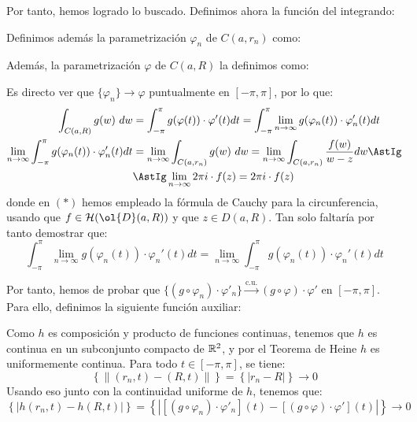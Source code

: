 \begin{ejercicio}
    Por tanto, hemos logrado lo buscado. Definimos ahora la función del integrando:

    Definimos además la parametrización $\varphi_n$ de $C(a,r_n)$ como:

    Además, la parametrización $\varphi$ de $C(a,R)$ la definimos como:

    Es directo ver que $\{\varphi_n\}\to \varphi$ puntualmente en $[-\pi,\pi]$, por lo que:
    \begin{align*}
        \int_{C(a,R)} g(w) \ dw &= \int_{-\pi}^\pi g(\varphi(t))\cdot \varphi'(t) dt
        = \int_{-\pi}^\pi \lim_{n\to\infty} g(\varphi_n(t))\cdot \varphi_n'(t) dt\\
        \lim_{n\to\infty} \int_{-\pi}^\pi g(\varphi_n(t))\cdot \varphi_n'(t) dt &= \lim_{n\to\infty} \int_{C(a,r_n)} g(w) \ dw
        = \lim_{n\to\infty} \int_{C(a,r_n)} \frac{f(w)}{w-z} dw \AstIg\\&\AstIg
        \lim_{n\to\infty} 2\pi i \cdot f(z) = 2\pi i \cdot f(z)
    \end{align*}
    donde en $(\ast)$ hemos empleado la fórmula de Cauchy para la circunferencia, usando que $f\in \cc{H}(\ol{D}(a,R))$ y que $z\in D(a,R)$. Tan solo faltaría por tanto demostrar que:
    \begin{equation*}
        \int_{-\pi}^\pi \lim_{n\to\infty} g(\varphi_n(t))\cdot \varphi_n'(t) dt = \lim_{n\to\infty} \int_{-\pi}^\pi g(\varphi_n(t))\cdot \varphi_n'(t) dt
    \end{equation*}

    Por tanto, hemos de probar que $\{(g\circ \varphi_n)\cdot \varphi'_n\}\xrightarrow{\text{c.u.}} (g\circ \varphi)\cdot \varphi'$ en $[-\pi,\pi]$. Para ello, definimos la siguiente función auxiliar:

    Como $h$ es composición y producto de funciones continuas, tenemos que $h$ es continua en un subconjunto compacto de $\mathbb{R}^2$, y por el Teorema de Heine $h$ es uniformemente continua. Para todo $t\in [-\pi,\pi]$, se tiene:
    \begin{equation*}
        \left\{\|(r_n,t)-(R,t)\|\right\}=\left\{|r_n-R|\right\}\to 0
    \end{equation*}
    Usando eso junto con la continuidad uniforme de $h$, tenemos que:
    \begin{equation*}
        \left\{|h(r_n,t)-h(R,t)|\right\}=\left\{\left|[(g\circ \varphi_n)\cdot \varphi'_n](t) - [(g\circ \varphi)\cdot \varphi'](t)\right|\right\}\to 0
    \end{equation*}


\end{ejercicio}
